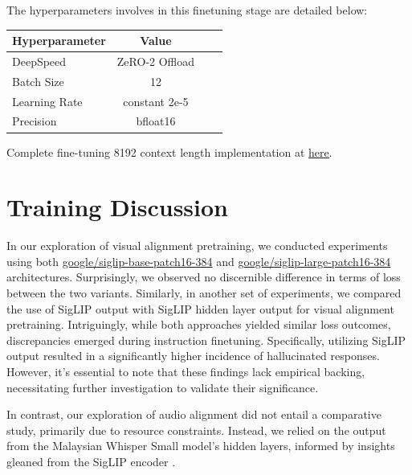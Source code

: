 \documentclass[preprint]{article}
\begin{document}
The hyperparameters involves in this finetuning stage are detailed below:

\begin{table}[h]
  \centering
  \begin{tabular}{lccl}
    \hline
    \textbf{Hyperparameter} & \textbf{Value} \\
    \hline
    DeepSpeed               & ZeRO-2 Offload \\
    Batch Size              & 12             \\
    Learning Rate           & constant 2e-5  \\
    Precision               & bfloat16       \\
    \hline
  \end{tabular}
\end{table}

Complete fine-tuning 8192 context length implementation at \href{https://github.com/mesolitica/multimodal-LLM/blob/master/run-deepspeed.sh}{here}.

\section{Training Discussion}

In our exploration of visual alignment pretraining, we conducted experiments using both \href{https://huggingface.co/google/siglip-base-patch16-384}{google/siglip-base-patch16-384} and \href{https://huggingface.co/google/siglip-large-patch16-384}{google/siglip-large-patch16-384} architectures. Surprisingly, we observed no discernible difference in terms of loss between the two variants. Similarly, in another set of experiments, we compared the use of SigLIP \cite{zhai2023sigmoid} output with SigLIP \cite{zhai2023sigmoid} hidden layer output for visual alignment pretraining. Intriguingly, while both approaches yielded similar loss outcomes, discrepancies emerged during instruction finetuning. Specifically, utilizing SigLIP \cite{zhai2023sigmoid} output resulted in a significantly higher incidence of hallucinated responses. However, it's essential to note that these findings lack empirical backing, necessitating further investigation to validate their significance.

In contrast, our exploration of audio alignment did not entail a comparative study, primarily due to resource constraints. Instead, we relied on the output from the Malaysian Whisper Small model's hidden layers, informed by insights gleaned from the SigLIP encoder \cite{zhai2023sigmoid}.
\end{document}
